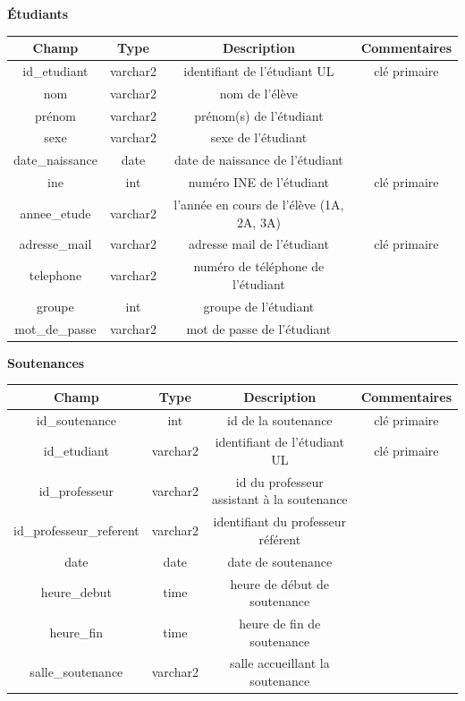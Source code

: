 \documentclass{scrreprt}
\begin{document}
\vspace {4cm}
\begin{center}
\textbf 
{Étudiants}
\vspace {0,5cm}

\begin{tabular}{|c|c|c|c|}
  \hline
  \textbf {Champ} & \textbf {Type} & \textbf {Description} & \textbf {Commentaires} \\
  \hline
  id_etudiant & varchar2 & identifiant de l'étudiant UL & clé primaire\\
  \hline
  nom & varchar2 & nom de l'élève &  \\
  \hline
  prénom & varchar2 & prénom(s) de l'étudiant &  \\
  \hline
  sexe & varchar2 & sexe de l'étudiant &  \\
  \hline
  date_naissance & date & date de naissance de l'étudiant &  \\
  \hline
  ine & int & numéro INE de l'étudiant & clé primaire \\
  \hline
  annee_etude & varchar2 & l'année en cours de l'élève (1A, 2A, 3A) &  \\
  \hline
  adresse_mail & varchar2 & adresse mail de l'étudiant & clé primaire\\
  \hline
  telephone & varchar2 & numéro de téléphone de l'étudiant &  \\
  \hline
  groupe & int & groupe de l'étudiant &  \\
  \hline
  mot_de_passe & varchar2 & mot de passe de l'étudiant &  \\
  \hline
\end{tabular}

\vspace {1cm}
\textbf 
{Soutenances}
\vspace {0,5cm}

\begin{tabular}{|c|c|c|c|}
  \hline
  \textbf {Champ} & \textbf {Type} & \textbf {Description} & \textbf {Commentaires} \\
  \hline
  id_soutenance & int & id de la soutenance & clé primaire\\
  \hline
  id_etudiant & varchar2 & identifiant de l'étudiant UL & clé primaire\\
  \hline
  id_professeur & varchar2 & id du professeur assistant à la soutenance &  \\
  \hline
  id_professeur_referent & varchar2 & identifiant du professeur référent &  \\
  \hline
  date & date & date de soutenance &  \\
  \hline
  heure_debut & time & heure de début de soutenance &  \\
  \hline
  heure_fin & time & heure de fin de soutenance &  \\
  \hline
  salle_soutenance & varchar2 & salle accueillant la soutenance &  \\
  \hline
\end{tabular}


\end{center}
\end{document}
